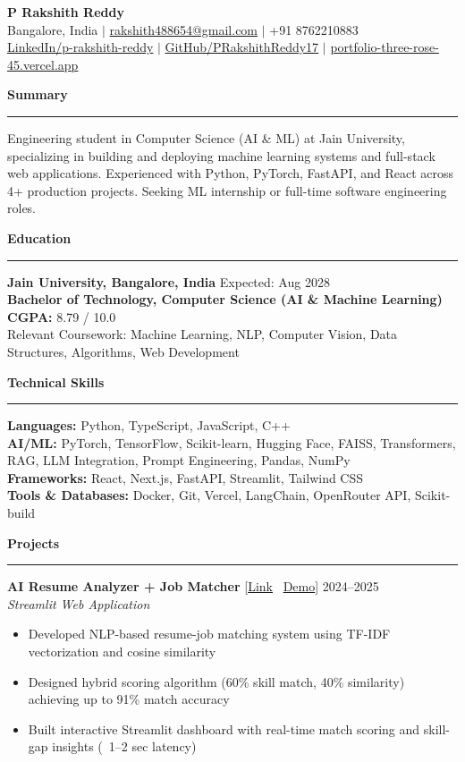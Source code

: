 \documentclass[10pt,letterpaper]{article}
\newcommand{\sectionheader}[1]{%
    \vspace{5pt}
    \textbf{\large #1}
    \vspace{-8pt}
    \par\noindent\rule{\textwidth}{0.4pt}\vspace{3pt}
}
\begin{document}
\thispagestyle{empty}

\begin{center}
{\Large\textbf{P Rakshith Reddy}}\\
Bangalore, India $|$ \href{mailto:rakshith488654@gmail.com}{rakshith488654@gmail.com} $|$ +91 8762210883\\
\href{https://www.linkedin.com/in/p-rakshith-reddy-09b932322/}{LinkedIn/p-rakshith-reddy} $|$ \href{https://github.com/PRakshithReddy17}{GitHub/PRakshithReddy17} $|$ \href{https://portfolio-three-rose-45.vercel.app}{portfolio-three-rose-45.vercel.app}
\end{center}

\vspace{-10pt}

\sectionheader{Summary}
Engineering student in Computer Science (AI \& ML) at Jain University, specializing in building and deploying machine learning systems and full-stack web applications. Experienced with Python, PyTorch, FastAPI, and React across 4+ production projects. Seeking ML internship or full-time software engineering roles.

\sectionheader{Education}
\textbf{Jain University, Bangalore, India} \hfill Expected: Aug 2028\\
\textbf{Bachelor of Technology, Computer Science (AI \& Machine Learning)}\\
\textbf{CGPA:} 8.79 / 10.0\\
Relevant Coursework: Machine Learning, NLP, Computer Vision, Data Structures, Algorithms, Web Development

\sectionheader{Technical Skills}
\textbf{Languages:} \quad Python, TypeScript, JavaScript, C++\\
\textbf{AI/ML:} \quad PyTorch, TensorFlow, Scikit-learn, Hugging Face, FAISS, Transformers, RAG, LLM Integration, Prompt Engineering, Pandas, NumPy\\
\textbf{Frameworks:} \quad React, Next.js, FastAPI, Streamlit, Tailwind CSS\\
\textbf{Tools \& Databases:} \quad Docker, Git, Vercel, LangChain, OpenRouter API, Scikit-build

\sectionheader{Projects}

\textbf{AI Resume Analyzer + Job Matcher} [\href{https://github.com/PRakshithReddy17/Resume_Analyzer}{Link} \textbar\ \href{https://resumeanalyzer-vwluxtrbq4gdse2m7nvqrs.streamlit.app/}{Demo}] \hfill 2024--2025\\
\textit{Streamlit Web Application}
\begin{itemize}
    \item Developed NLP-based resume-job matching system using TF-IDF vectorization and cosine similarity
    \item Designed hybrid scoring algorithm (60\% skill match, 40\% similarity) achieving up to 91\% match accuracy
    \item Built interactive Streamlit dashboard with real-time match scoring and skill-gap insights (~1--2 sec latency)
\end{itemize}
\end{document}
